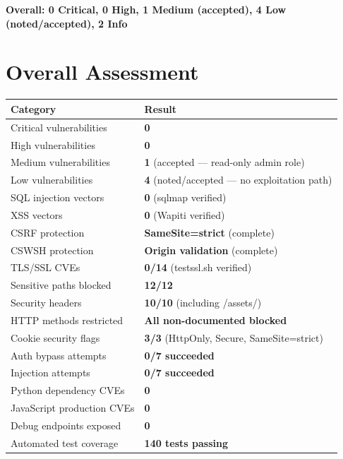 \documentclass[11pt,a4paper]{article}
\begin{document}
\begin{center}
\textbf{Overall: 0 Critical, 0 High, 1 Medium (accepted), 4 Low (noted/accepted), 2 Info}
\end{center}

\section{Overall Assessment}

\begin{center}
\begin{tabular}{ll}
\toprule
\textbf{Category} & \textbf{Result} \\
\midrule
Critical vulnerabilities & \textbf{0} \\
High vulnerabilities & \textbf{0} \\
Medium vulnerabilities & \textbf{1} (accepted --- read-only admin role) \\
Low vulnerabilities & \textbf{4} (noted/accepted --- no exploitation path) \\
SQL injection vectors & \textbf{0} (sqlmap verified) \\
XSS vectors & \textbf{0} (Wapiti verified) \\
CSRF protection & \textbf{SameSite=strict} (complete) \\
CSWSH protection & \textbf{Origin validation} (complete) \\
TLS/SSL CVEs & \textbf{0/14} (testssl.sh verified) \\
Sensitive paths blocked & \textbf{12/12} \\
Security headers & \textbf{10/10} (including /assets/) \\
HTTP methods restricted & \textbf{All non-documented blocked} \\
Cookie security flags & \textbf{3/3} (HttpOnly, Secure, SameSite=strict) \\
Auth bypass attempts & \textbf{0/7 succeeded} \\
Injection attempts & \textbf{0/7 succeeded} \\
Python dependency CVEs & \textbf{0} \\
JavaScript production CVEs & \textbf{0} \\
Debug endpoints exposed & \textbf{0} \\
Automated test coverage & \textbf{140 tests passing} \\
\bottomrule
\end{tabular}
\end{center}
\end{document}
